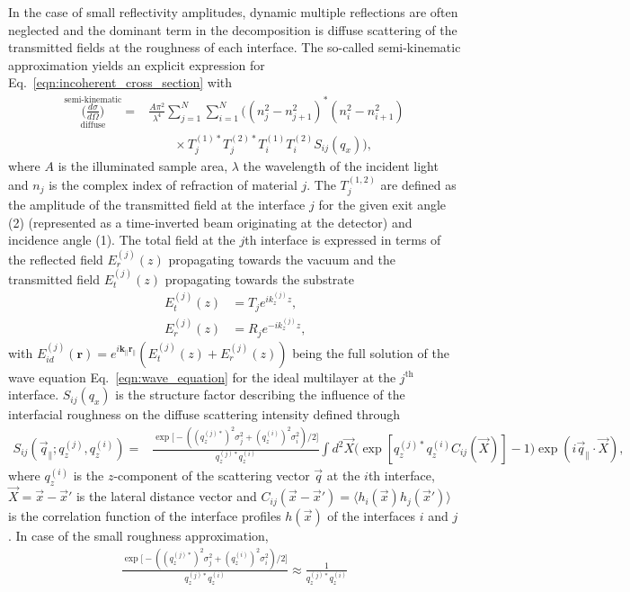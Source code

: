 In the case of small reflectivity amplitudes, dynamic multiple reflections are often neglected and the dominant term in the decomposition is diffuse scattering of the transmitted fields at the roughness of each interface. The so-called semi-kinematic approximation \cite{sinha_x-ray_1988} yields an explicit expression for Eq.~\eqref{eqn:incoherent_cross_section} with
\begin{align}
                \overset{\text{semi-kinematic}}{\underset{\text{diffuse}}{\Big(\frac{d \sigma}{d \Omega}\Big)}} = &\frac{A \pi^2}{\lambda^4}\sum \limits_{j=1}^{N}\sum \limits_{i=1}^{N} \Big((n_j^2 - n_{j+1}^2)^* (n_i^2 - n_{i+1}^2) \nonumber \\ &\qquad\times T^{(1)*}_j T^{(2)*}_j T^{(1)}_i T^{(2)}_i S_{i j}(q_x)\Big)\text{,} \label{eqn:semi_kinematic_theory} 
\end{align}
where $A$ is the illuminated sample area, $\lambda$ the wavelength of the incident light and $n_j$ is the complex index of refraction of material $j$. The $T^{(1,2)}_j$ are defined as the amplitude of the transmitted field at the interface $j$ for the given exit angle (2) (represented as a time-inverted beam originating at the detector) and incidence angle (1). The total field at the $j$th interface is expressed in terms of the reflected field $E_r^{(j)}(z)$ propagating towards the vacuum and the transmitted field $E_t^{(j)}(z)$ propagating towards the substrate
\begin{align}
        E_t^{(j)}(z) &= T_{j} e^{i k_z^{(j)} z} \text{,} \\
        E_r^{(j)}(z) &= R_{j} e^{-i k_z^{(j)} z} \text{,} 
\end{align}
with $E_{id}^{(j)}(\mathbf{r}) = e^{i \mathbf{k_\parallel r_\parallel}} (E_t^{(j)}(z) + E_r^{(j)}(z))$ being the full solution of the wave equation Eq.~\eqref{eqn:wave_equation} for the ideal multilayer at the $j^\text{th}$ interface. $S_{ij}(q_x)$ is the structure factor describing the influence of the interfacial roughness on the diffuse scattering intensity defined through
\begin{align}
S_{ij}(\vec{q}_\parallel; q_z^{(j)}, q_z^{(i)}) = &\frac{\exp \Big[-((q_z^{(j)*})^{2} \sigma_j^2 + (q_z^{(i)})^{2} \sigma_i^2)/2\Big]}{q_z^{(j)*} q_z^{(i)}} \int d^2 \vec{X} \Big(\exp [q_z^{(j)*} q_z^{(i)} C_{ij}(\vec{X})]-1\Big) \exp(i \vec{q}_\parallel \cdot \vec{X}) \text{,} \label{eqn:full_structure_factor}
\end{align}
where $q_z^{(i)}$ is the $z$-component of the scattering vector $\vec{q}$ at the $i$th interface, $\vec{X} = \vec{x} - \vec{x}'$ is the lateral distance vector and $C_{ij}(\vec{x}-\vec{x}') = \langle h_i(\vec{x}) h_j(\vec{x}') \rangle$ is the correlation function of the interface profiles $h(\vec{x})$ of the interfaces $i$ and $j$ \cite{de_boer_x-ray_1995,de_boer_x-ray_1996}. In case of the small roughness approximation, \begin{align}
\frac{\exp \Big[-((q_z^{(j)*})^2 \sigma_j^2 + (q_z^{(i)})^{2} \sigma_i^2)/2\Big]}{q_z^{(j)*} q_z^{(i)}} \approx \frac{1}{q_z^{(j)*} q_z^{(i)}}
\end{align}
